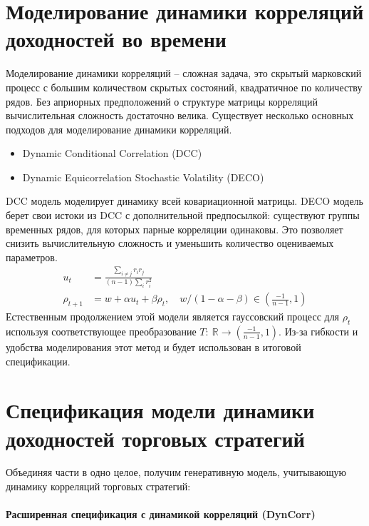 \section{Моделирование динамики корреляций доходностей во времени}
Моделирование динамики корреляций -- сложная задача, это скрытый марковский процесс с большим количеством скрытых состояний, квадратичное по количеству рядов. Без априорных предположений о структуре матрицы корреляций вычислительная сложность достаточно велика. Существует несколько основных подходов для моделирование динамики корреляций.
\begin{itemize}
	\item Dynamic Conditional Correlation (DCC) \citep{engle2000}
	\item Dynamic Equicorrelation Stochastic Volatility (DECO) \citep{kurose2016}
\end{itemize}
DCC модель моделирует динамику всей ковариационной матрицы. DECO модель берет свои истоки из DCC с дополнительной предпосылкой: существуют группы временных рядов, для которых парные корреляции одинаковы. Это позволяет снизить вычислительную сложность и уменьшить количество оцениваемых параметров.
\begin{align}
u_t &= \frac{\sum_{i\neq j} r_i r_j}{(n-1) \sum_{i} r_i^2}\\
\rho_{t+1} &= w + \alpha u_t + \beta \rho_t, \quad w/(1-\alpha-\beta) \in \left(\tfrac{-1}{n-1}, 1\right)
\end{align}
Естественным продолжением этой модели является гауссовский процесс для $\rho_t$ используя соответствующее преобразование $T:\: \mathbb{R} \to \left(\tfrac{-1}{n-1}, 1\right)$. Из-за гибкости и удобства моделирования этот метод и будет использован в итоговой спецификации.

\section{Спецификация модели динамики доходностей торговых стратегий}
Объединяя части в одно целое, получим генеративную модель, учитывающую динамику корреляций торговых стратегий:
\paragraph{Расширенная спецификация с динамикой корреляций (DynCorr)}



